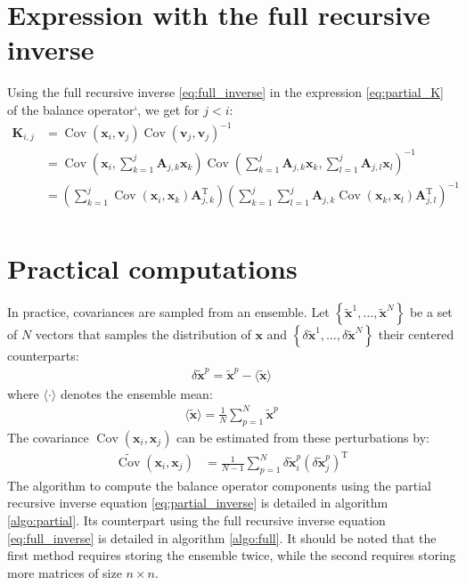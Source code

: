 \documentclass[12pt]{article}
\DeclareMathOperator{\Cov}{Cov}
\begin{document}
\section{Expression with the full recursive inverse}
Using the full recursive inverse \eqref{eq:full_inverse} in the expression \eqref{eq:partial_K} of the balance operator`, we get for $j < i$:
\begin{align}
\mathbf{K}_{i,j} & = \Cov\left(\mathbf{x}_i,\mathbf{v}_j\right)\Cov\left(\mathbf{v}_j,\mathbf{v}_j\right)^{-1} \nonumber \\
& = \Cov\left(\mathbf{x}_i,\sum_{k=1}^j \mathbf{A}_{j,k} \mathbf{x}_k\right)\Cov\left(\sum_{k=1}^j \mathbf{A}_{j,k} \mathbf{x}_k,\sum_{l=1}^j \mathbf{A}_{j,l} \mathbf{x}_l\right)^{-1} \nonumber \\
& = \left(\sum_{k=1}^j\Cov\left(\mathbf{x}_i,\mathbf{x}_k\right) \mathbf{A}_{j,k}^\mathrm{T}\right) \left(\sum_{k=1}^j \sum_{l=1}^j\mathbf{A}_{j,k}\Cov\left(\mathbf{x}_k,\mathbf{x}_l\right) \mathbf{A}_{j,l}^\mathrm{T}\right)^{-1} \nonumber \\
\end{align}

\section{Practical computations}
In practice, covariances are sampled from an ensemble. Let $\left\{\widetilde{\mathbf{x}}^1,\dots,\widetilde{\mathbf{x}}^N\right\}$ be a set of $N$ vectors that samples the distribution of $\mathbf{x}$ and $\left\{\delta \widetilde{\mathbf{x}}^1,\dots,\delta \widetilde{\mathbf{x}}^N\right\}$ their centered counterparts:
\begin{align}
\delta \widetilde{\mathbf{x}}^p = \widetilde{\mathbf{x}}^p - \langle \widetilde{\mathbf{x}} \rangle
\end{align}
where $\langle \cdot \rangle$ denotes the ensemble mean:
\begin{align}
\label{eq:exp_estim}
\langle \widetilde{\mathbf{x}} \rangle = \frac{1}{N} \sum_{p=1}^N \widetilde{\mathbf{x}}^p
\end{align}
The covariance $\Cov \left(\mathbf{x}_i,\mathbf{x}_j\right)$ can be estimated from these perturbations by:
\begin{align}
\label{eq:cov_estim}
\widetilde{\Cov}\left(\mathbf{x}_i,\mathbf{x}_j\right) & = \frac{1}{N-1} \sum_{p=1}^N \delta \widetilde{\mathbf{x}}^p_i \left(\delta \widetilde{\mathbf{x}}^p_j\right)^\mathrm{T}
\end{align}
$ $\\
The algorithm to compute the balance operator components using the partial recursive inverse equation \eqref{eq:partial_inverse} is detailed in algorithm \ref{algo:partial}. Its counterpart using the full recursive inverse equation \eqref{eq:full_inverse} is detailed in algorithm \ref{algo:full}. It should be noted that the first method requires storing the ensemble twice, while the second requires storing more matrices of size $n \times n$.
\end{document}
